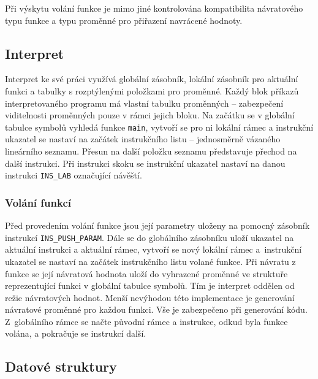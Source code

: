 \documentclass[a4paper, 12pt]{article}
\begin{document}
Při výskytu volání funkce je mimo jiné kontrolována kompatibilita návratového
typu funkce a typu proměnné pro přiřazení navrácené hodnoty.

\subsection{Interpret} \label{interpret}
Interpret ke své práci využívá globální zásobník, lokální zásobník pro aktuální
funkci a tabulky s rozptýlenými položkami pro proměnné. Každý blok příkazů
interpretovaného programu má vlastní tabulku proměnných -- zabezpečení viditelnosti
proměnných pouze v rámci jejich bloku.
Na začátku se v globální tabulce symbolů vyhledá funkce \texttt{main},
vytvoří se pro ni lokální rámec a instrukční ukazatel se nastaví na začátek
instrukčního listu -- jednosměrně vázaného lineárního seznamu.
Přesun na další položku seznamu představuje přechod na další instrukci.
Při instrukci skoku se instrukční ukazatel nastaví
na danou instrukci \texttt{INS\_LAB} označující návěští.

\subsubsection{Volání funkcí}
Před provedením volání funkce jsou její parametry uloženy na pomocný zásobník
instrukcí \texttt{INS\_PUSH\_PARAM}. Dále se do globálního zásobníku uloží
ukazatel na aktuální instrukci a aktuální rámec, vytvoří se nový lokální rámec
a~instrukční ukazatel se nastaví na začátek instrukčního listu volané funkce.
Při návratu z funkce se její návratová hodnota uloží do vyhrazené
proměnné ve struktuře reprezentující funkci v globální tabulce symbolů.
Tím je interpret oddělen od režie návratových hodnot. Menší nevýhodou této
implementace je generování návratové proměnné pro každou funkci.
Vše je zabezpečeno při generování kódu. Z~globálního rámce se načte původní
rámec a instrukce, odkud byla funkce volána, a pokračuje se instrukcí další.

\newpage

\subsection{Datové struktury}
\end{document}

